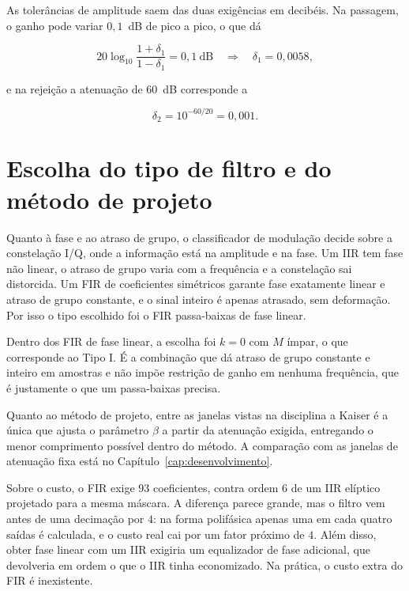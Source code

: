 As tolerâncias de amplitude saem das duas exigências em decibéis. Na passagem, o ganho pode variar $0{,}1$~dB de pico a pico, o que dá

\begin{equation}
20\log_{10}\frac{1+\delta_1}{1-\delta_1} = 0{,}1 \ \mathrm{dB}
\quad \Longrightarrow \quad
\delta_1 = 0{,}0058 ,
\end{equation}

e na rejeição a atenuação de $60$~dB corresponde a

\begin{equation}
\delta_2 = 10^{-60/20} = 0{,}001 .
\end{equation}

\section{Escolha do tipo de filtro e do método de projeto}

Quanto à fase e ao atraso de grupo, o classificador de modulação decide sobre a constelação I/Q, onde a informação está na amplitude e na fase. Um IIR tem fase não linear, o atraso de grupo varia com a frequência e a constelação sai distorcida. Um FIR de coeficientes simétricos garante fase exatamente linear e atraso de grupo constante, e o sinal inteiro é apenas atrasado, sem deformação. Por isso o tipo escolhido foi o FIR passa-baixas de fase linear.

Dentro dos FIR de fase linear, a escolha foi $k = 0$ com $M$ ímpar, o que corresponde ao Tipo I. É a combinação que dá atraso de grupo constante e inteiro em amostras e não impõe restrição de ganho em nenhuma frequência, que é justamente o que um passa-baixas precisa.

Quanto ao método de projeto, entre as janelas vistas na disciplina a Kaiser é a única que ajusta o parâmetro $\beta$ a partir da atenuação exigida, entregando o menor comprimento possível dentro do método. A comparação com as janelas de atenuação fixa está no Capítulo~\ref{cap:desenvolvimento}.

Sobre o custo, o FIR exige $93$ coeficientes, contra ordem $6$ de um IIR elíptico projetado para a mesma máscara. A diferença parece grande, mas o filtro vem antes de uma decimação por $4$: na forma polifásica apenas uma em cada quatro saídas é calculada, e o custo real cai por um fator próximo de $4$. Além disso, obter fase linear com um IIR exigiria um equalizador de fase adicional, que devolveria em ordem o que o IIR tinha economizado. Na prática, o custo extra do FIR é inexistente.

